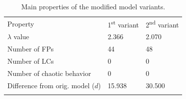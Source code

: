 \documentclass[graybox]{svmult}
\begin{document}
\begin{table}
\caption{Main properties of the modified model variants.}
\label{tab:variantsProps}
\begin{center}
\begin{tabular}{lll}
\hline\noalign{\smallskip}
Property & 1\textsuperscript{st} variant & 2\textsuperscript{nd} variant\\
\noalign{\smallskip}\svhline\noalign{\smallskip}
$\lambda$ value & 2.366 & 2.070 \\
Number of FPs & 44 & 48 \\
Number of LCs & 0 & 0 \\
Number of chaotic behavior & 0 & 0 \\
Difference from orig. model ($d$) & 15.938 & 30.500 \\
\noalign{\smallskip}\hline
\end{tabular}
\end{center}
\end{table}


\end{document}
